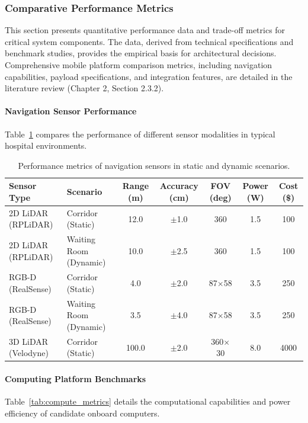 \subsubsection{Comparative Performance Metrics}

This section presents quantitative performance data and trade-off metrics for critical system components. The data, derived from technical specifications and benchmark studies, provides the empirical basis for architectural decisions. Comprehensive mobile platform comparison metrics, including navigation capabilities, payload specifications, and integration features, are detailed in the literature review (Chapter 2, Section 2.3.2).

\paragraph{Navigation Sensor Performance}
Table~\ref{tab:sensor_metrics} compares the performance of different sensor modalities in typical hospital environments.

\begin{table}[H]
\centering
\scriptsize
\begin{tabularx}{\linewidth}{|>{\raggedright\arraybackslash}X|>{\raggedright\arraybackslash}X|c|c|c|c|c|}
\hline
\textbf{Sensor Type} & \textbf{Scenario} & \textbf{Range (m)} & \textbf{Accuracy (cm)} & \textbf{FOV (deg)} & \textbf{Power (W)} & \textbf{Cost (\$)} \\
\hline
2D LiDAR (RPLiDAR) \cite{rplidar2024} & Corridor (Static) & 12.0 & $\pm$1.0 & 360 & 1.5 & 100 \\
\hline
2D LiDAR (RPLiDAR) \cite{rplidar2024} & Waiting Room (Dynamic) & 10.0 & $\pm$2.5 & 360 & 1.5 & 100 \\
\hline
RGB-D (RealSense) \cite{realsense2024} & Corridor (Static) & 4.0 & $\pm$2.0 & 87$\times$58 & 3.5 & 250 \\
\hline
RGB-D (RealSense) \cite{realsense2024} & Waiting Room (Dynamic) & 3.5 & $\pm$4.0 & 87$\times$58 & 3.5 & 250 \\
\hline
3D LiDAR (Velodyne) \cite{velodyne2024} & Corridor (Static) & 100.0 & $\pm$2.0 & 360$\times$30 & 8.0 & 4000 \\
\hline
\end{tabularx}
\caption{Performance metrics of navigation sensors in static and dynamic scenarios.}
\label{tab:sensor_metrics}
\end{table}

\paragraph{Computing Platform Benchmarks}
Table~\ref{tab:compute_metrics} details the computational capabilities and power efficiency of candidate onboard computers.

